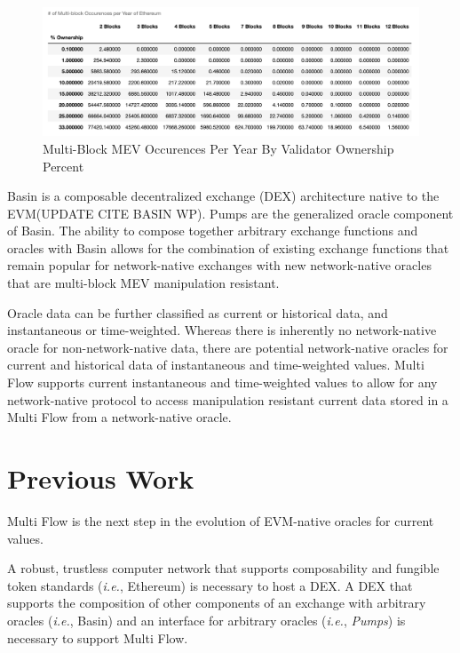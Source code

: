 \documentclass[tikz]{article}
\newcommand{\term}[1]{\textsl{#1}}
\begin{document}
\begin{figure}[h!]
    \centering
    \includegraphics[scale=.25]{Figure15}
    \vspace*{-5mm}
    \caption{Multi-Block MEV Occurences Per Year By Validator Ownership Percent}
    \label{fig 2}
\end{figure}

Basin is a composable decentralized exchange (DEX) architecture native to the EVM(UPDATE CITE BASIN WP). Pumps are the generalized oracle component of Basin. The ability to compose together arbitrary exchange functions and oracles with Basin allows for the combination of existing exchange functions that remain popular for network-native exchanges with new network-native oracles that are multi-block MEV manipulation resistant.

Oracle data can be further classified as current or historical data, and instantaneous or time-weighted. Whereas there is inherently no network-native oracle for non-network-native data, there are potential network-native oracles for current and historical data of instantaneous and time-weighted values. Multi Flow supports current instantaneous and time-weighted values to allow for any network-native protocol to access manipulation resistant current data stored in a Multi Flow from a network-native oracle.

\section{Previous Work}
Multi Flow is the next step in the evolution of EVM-native oracles for current values.

A robust, trustless computer network that supports composability and fungible token standards (\textit{i.e.}, Ethereum) is necessary to host a DEX. A DEX that supports the composition of other components of an exchange with arbitrary oracles (\textit{i.e.}, Basin) and an interface for arbitrary oracles (\textit{i.e.}, \term{Pumps}) is necessary to support Multi Flow. 
\end{document}
